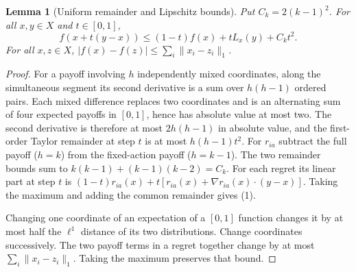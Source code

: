 \documentclass[11pt,a4paper]{article}
\newtheorem{lemma}[theorem]{Lemma}
\begin{document}
\begin{lemma}[Uniform remainder and Lipschitz bounds]
Put $C_k=2(k-1)^2$. For all $x,y\in X$ and $t\in[0,1]$,
\[
 f(x+t(y-x))\leq(1-t)f(x)+tL_x(y)+C_kt^2.             \tag{1}
\]
For all $x,z\in X$, $|f(x)-f(z)|\leq\sum_i\|x_i-z_i\|_1$.
\end{lemma}
\begin{proof}
For a payoff involving $h$ independently mixed coordinates, along the simultaneous segment its second derivative is a sum over $h(h-1)$ ordered pairs. Each mixed difference replaces two coordinates and is an alternating sum of four expected payoffs in $[0,1]$, hence has absolute value at most two. The second derivative is therefore at most $2h(h-1)$ in absolute value, and the first-order Taylor remainder at step $t$ is at most $h(h-1)t^2$.
For $r_{ia}$ subtract the full payoff ($h=k$) from the fixed-action payoff ($h=k-1$). The two remainder bounds sum to
$k(k-1)+(k-1)(k-2)=C_k$. For each regret its linear part at step $t$ is
$(1-t)r_{ia}(x)+t[r_{ia}(x)+\nabla r_{ia}(x)\cdot(y-x)]$.
Taking the maximum and adding the common remainder gives (1).

Changing one coordinate of an expectation of a $[0,1]$ function changes it by at most half the $\ell^1$ distance of its two distributions. Change coordinates successively. The two payoff terms in a regret together change by at most $\sum_i\|x_i-z_i\|_1$. Taking the maximum preserves that bound.
\end{proof}
\end{document}
